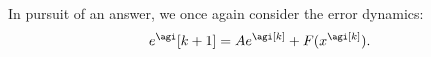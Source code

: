 In pursuit of an answer, we once again consider the error dynamics:
\begin{equation}
	e^\agi[{k+1}] = A e^\agi[k] + F(x^\agi[k]). 
\end{equation}


%
%
%
%
%
%


